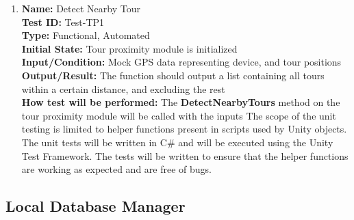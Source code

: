 \documentclass[12pt, titlepage]{article}
\begin{document}
\begin{enumerate}
  \item \textbf{Name:} Detect Nearby Tour \label{itm:Test-TP1} \\
        \textbf{Test ID:} Test-TP1 \\
        \textbf{Type:} Functional, Automated \\
        \textbf{Initial State:} Tour proximity module is initialized \\
        \textbf{Input/Condition:} Mock GPS data representing device, and tour positions \\
        \textbf{Output/Result:} The function should output a list containing all tours within a certain distance, and excluding the rest \\
        \textbf{How test will be performed:} The \textbf{DetectNearbyTours} method on the tour proximity module will be called with the inputs
        The scope of the unit testing is limited to helper functions present in scripts used by Unity objects. The unit tests will be written in C\# and will be executed using the Unity Test Framework. The tests will be written to ensure that the helper functions are working as expected and are free of bugs.

\end{enumerate}

\subsection{Local Database Manager}
\end{document}
